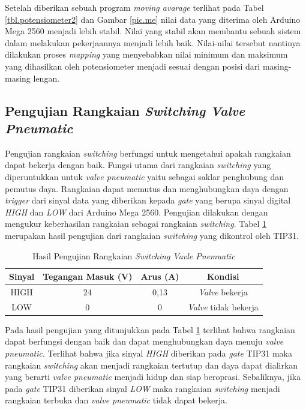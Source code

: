 Setelah diberikan sebuah program \textit{moving avarage} terlihat pada Tabel \ref{tbl.potensiometer2} dan Gambar \ref{pic.me} nilai data yang diterima oleh Arduino Mega 2560 menjadi lebih stabil. Nilai yang stabil akan membantu sebuah sistem dalam melakukan pekerjaannya menjadi lebih baik. Nilai-nilai tersebut nantinya dilakukan proses \textit{mapping} yang menyebabkan nilai minimum dan maksimum yang dihasilkan oleh potensiometer menjadi sesuai dengan posisi dari masing-masing lengan.

\subsection{Pengujian Rangkaian \textit{Switching Valve Pneumatic}}
Pengujian rangkaian \textit{switching} berfungsi untuk mengetahui apakah rangkaian dapat bekerja dengan baik. Fungsi utama dari rangkaian \textit{switching} yang diperuntukkan untuk \textit{valve pneumatic} yaitu sebagai saklar penghubung dan pemutus daya. Rangkaian dapat memutus dan menghubungkan daya dengan \textit{trigger} dari sinyal data yang diberikan kepada \textit{gate} yang berupa sinyal digital \textit{HIGH} dan \textit{LOW} dari Arduino Mega 2560. Pengujian dilakukan dengan mengukur keberhasilan rangkaian sebagai rangkaian \textit{switching}. Tabel \ref{tbl.rangkaiantip} merupakan hasil pengujian dari rangkaian \textit{switching} yang dikontrol oleh TIP31.
\begin{table}[H]
	\centering
	\caption{Hasil Pengujian Rangkaian \textit{Switching Vavle Pnemuatic}}
	\label{tbl.rangkaiantip}
	\begin{tabular}{|c|c|c|c|}
		\hline
		\rowcolor[HTML]{9B9B9B} 
		Sinyal & Tegangan Masuk (V) & Arus (A) & Kondisi             \\ \hline
		HIGH   & 24                 & 0,13     & \textit{Valve} bekerja       \\ \hline
		LOW    & 0                  & 0      & \textit{Valve} tidak bekerja \\ \hline
	\end{tabular}
	
\end{table} 

Pada hasil pengujian yang ditunjukkan pada Tabel \ref{tbl.rangkaiantip} terlihat bahwa rangkaian dapat berfungsi dengan baik dan dapat menghubungkan daya menuju \textit{valve pneumatic}. Terlihat bahwa jika sinyal \textit{HIGH} diberikan pada \textit{gate} TIP31 maka rangkaian \textit{switching} akan menjadi rangkaian tertutup dan daya dapat dialirkan yang berarti \textit{valve pneumatic} menjadi hidup dan siap beroprasi. Sebaliknya, jika pada \textit{gate} TIP31 diberikan sinyal \textit{LOW} maka rangkaian \textit{switching} menjadi rangkaian terbuka dan \textit{valve pneumatic} tidak dapat bekerja.
	
